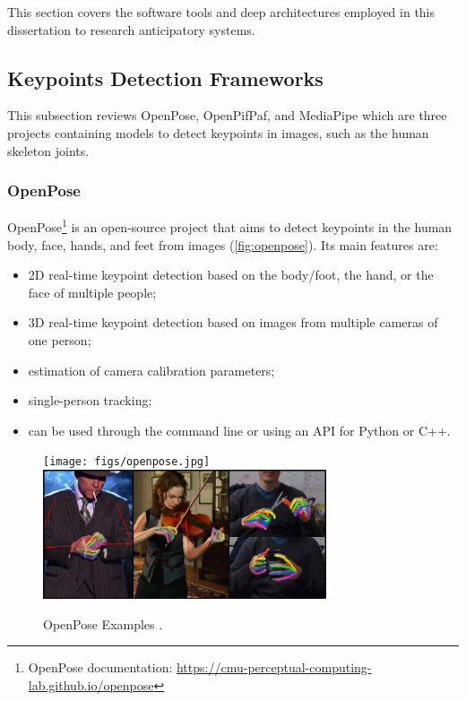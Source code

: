 This section covers the software tools and deep architectures employed in this dissertation to research anticipatory systems.

\subsection{Keypoints Detection Frameworks}
\label{subsection:keypointdetection}

This subsection reviews OpenPose, OpenPifPaf, and MediaPipe which are three projects containing models to detect keypoints in images, such as the human skeleton joints.

\subsubsection{OpenPose}

OpenPose\cite{Cao2021,Simon2017,Cao2018,Wei2016}\footnote{OpenPose documentation: \url{https://cmu-perceptual-computing-lab.github.io/openpose}} is an open-source project that aims to detect keypoints in the human body, face, hands, and feet from images (\autoref{fig:openpose}). Its main features are:
\begin{itemize}
    \item 2D real-time keypoint detection based on the body/foot, the hand, or the face of multiple people;
    \item 3D real-time keypoint detection based on images from multiple cameras of one person;
    \item estimation of camera calibration parameters;
    \item single-person tracking;
    \item can be used through the command line or using an API for Python or C++.
\end{itemize}

\begin{figure}[ht]
    \centerline{\texttt{[image: figs/openpose.jpg]} \includegraphics[height=1.5in]{figs/openpose2.jpg}}
    \caption[OpenPose Examples.]{OpenPose Examples \cite{Cao2021,Simon2017}.}
    \label{fig:openpose}
\end{figure}

